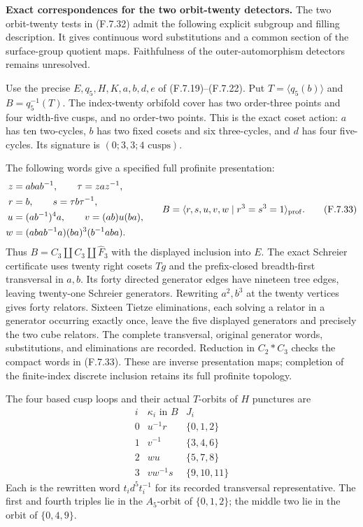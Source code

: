 \medskip\noindent\textbf{Exact correspondences for the two orbit-twenty detectors.}
The two orbit-twenty tests in (F.7.32) admit the following
explicit subgroup and filling description. It gives
continuous word substitutions and a common section of
the surface-group quotient maps. Faithfulness of the
outer-automorphism detectors remains unresolved.

Use the precise $E,q_5,H,K,a,b,d,e$ of (F.7.19)--(F.7.22).
Put $T=\langle q_5(b)\rangle$ and $B=q_5^{-1}(T)$.
The index-twenty orbifold cover has two order-three
points and four width-five cusps, and no order-two
points. This is the exact coset action: $a$ has ten
two-cycles, $b$ has two fixed cosets and six three-cycles,
and $d$ has four five-cycles. Its signature is
$(0;3,3;4\text{ cusps})$.

The following words give a specified full profinite
presentation:
\[
 \begin{split}
 z&=aba b^{-1},\qquad \tau=zaz^{-1},\\
 r&=b,\qquad s=\tau b\tau^{-1},\\
 u&=(ab^{-1})^4a,\qquad v=(ab)u(ba),\\
 w&=(aba b^{-1}a)(ba)^3(b^{-1}aba).
 \end{split}
 \qquad
 B=\langle r,s,u,v,w\mid r^3=s^3=1\rangle_{\rm prof}.
                                                               \tag{F.7.33}
\]
Thus $B=C_3\amalg C_3\amalg\widehat F_3$ with the
displayed inclusion into $E$. The exact Schreier
certificate uses twenty right cosets $Tg$ and the
prefix-closed breadth-first transversal in $a,b$.
Its forty directed generator edges have nineteen
tree edges, leaving twenty-one Schreier generators.
Rewriting $a^2,b^3$ at the twenty vertices gives
forty relators. Sixteen Tietze eliminations, each
solving a relator in a generator occurring exactly
once, leave the five displayed generators and
precisely the two cube relators.
The complete transversal, original generator words,
substitutions, and eliminations are recorded.
Reduction in $C_2*C_3$ checks the compact words in
(F.7.33). These are inverse presentation maps;
completion of the finite-index discrete inclusion
retains its full profinite topology.

The four based cusp loops and their actual
$T$-orbits of $H$ punctures are
\[
 \begin{array}{c|c|c}
 i&\kappa_i\text{ in }B&J_i\\ \hline
 0&u^{-1}r&\{0,1,2\}\\
 1&v^{-1}&\{3,4,6\}\\
 2&wu&\{5,7,8\}\\
 3&vw^{-1}s&\{9,10,11\}
 \end{array}                                                \tag{F.7.34}
\]
Each is the rewritten word $t_i d^5t_i^{-1}$
for its recorded transversal representative.
The first and fourth triples lie in the
$A_5$-orbit of $\{0,1,2\}$; the middle two lie
in the orbit of $\{0,4,9\}$.

